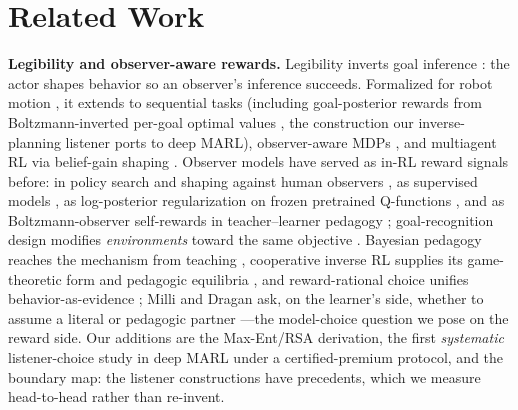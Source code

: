 \documentclass[sigconf,review,anonymous]{acmart}
\begin{document}
\section{Related Work}
\label{sec:related}

\textbf{Legibility and observer-aware rewards.} Legibility inverts goal inference \cite{ziebart2008maximum,baker2017rational,ramirez2010plan}: the actor shapes behavior so an observer's inference succeeds. Formalized for robot motion \cite{dragan2013legibility}, it extends to sequential tasks (including goal-posterior rewards from Boltzmann-inverted per-goal optimal values \cite{faria2024guess}, the construction our inverse-planning listener ports to deep MARL), observer-aware MDPs \cite{miura2021unifying,miura2024observer}, and multiagent RL via belief-gain shaping \cite{liu2025active}. Observer models have served as in-RL reward signals before: in policy search and shaping against human observers \cite{busch2017learning,bied2020integrating}, as supervised models \cite{wallkotter2022slotv}, as log-posterior regularization on frozen pretrained Q-functions \cite{persiani2022policy}, and as Boltzmann-observer self-rewards in teacher--learner pedagogy \cite{caselles2022pragmatically}; goal-recognition design modifies \emph{environments} toward the same objective \cite{keren2014goal}. Bayesian pedagogy reaches the mechanism from teaching \cite{ho2016showing,fisac2017pragmatic}, cooperative inverse RL supplies its game-theoretic form and pedagogic equilibria \cite{hadfieldmenell2016cooperative}, and reward-rational choice unifies behavior-as-evidence \cite{jeon2020reward}; Milli and Dragan ask, on the learner's side, whether to assume a literal or pedagogic partner \cite{milli2019literal}---the model-choice question we pose on the reward side. Our additions are the Max-Ent/RSA derivation, the first \emph{systematic} listener-choice study in deep MARL under a certified-premium protocol, and the boundary map: the listener constructions have precedents, which we measure head-to-head rather than re-invent.
\end{document}
